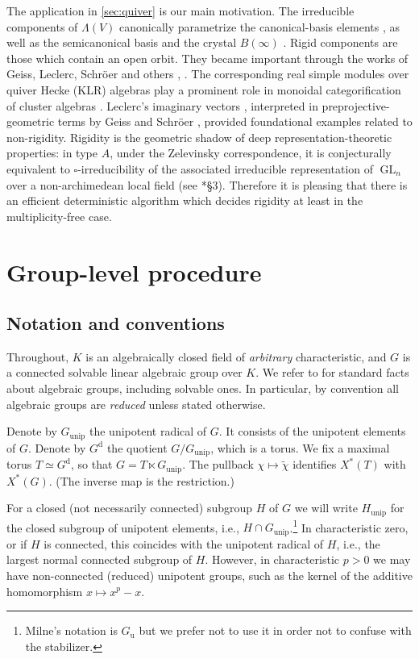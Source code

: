 \documentclass[12pt]{article}
\newcommand{\GL}{\operatorname{GL}}
\newcommand{\rad}[1]{#1_{\operatorname{unip}}}
\newcommand{\diag}{\mathrm{d}}
\begin{document}
The application in \cref{sec:quiver} is our main motivation. 
The irreducible components of $\Lambda(V)$ canonically parametrize the canonical-basis elements \cite{MR1088333}, as well as 
the semicanonical basis \cite{MR1758244} and the crystal $B(\infty)$ \cite{MR1458969}.
Rigid components are those which contain an open orbit. They became important through the works of Geiss, Leclerc, Schr\"oer and others \cite{MR2115084}, \cite{MR2144987}.
The corresponding real simple modules over quiver Hecke (KLR) algebras play a prominent role in monoidal categorification of cluster algebras \cite{MR3758148}.
Leclerc's imaginary vectors \cite{MR1959765}, interpreted in preprojective-geometric terms by Geiss and Schr\"oer \cite{MR2115084}, provided foundational examples related to non-rigidity.
Rigidity is the geometric shadow of deep representation-theoretic properties: in type $A$, 
under the Zelevinsky correspondence, it is conjecturally equivalent to $\square$-irreducibility of the associated irreducible representation of $\GL_n$ over a non-archimedean local field
(see \cite{MR4847251}*{\S3}).
Therefore it is pleasing that there is an efficient deterministic algorithm which decides rigidity at least in the multiplicity-free case.



\section{Group-level procedure}\label{sec:setup}

\subsection{Notation and conventions}
Throughout, $K$ is an algebraically closed field of
\emph{arbitrary} characteristic, and $G$ is a connected solvable linear algebraic group over $K$.
We refer to \cite{MR1102012} for standard facts about algebraic groups, including solvable ones.
In particular, by convention all algebraic groups are \emph{reduced} unless stated otherwise.

Denote by $\rad{G}$ the unipotent radical of $G$. It consists of the unipotent elements of $G$.
Denote by $G^{\diag}$ the quotient $G/\rad{G}$, which is a torus.
We fix a maximal torus $T\simeq G^{\diag}$, so that $G=T\ltimes \rad{G}$.
The pullback $\chi\mapsto\tilde\chi$ identifies $X^*(T)$ with $X^*(G)$.
(The inverse map is the restriction.)

For a closed (not necessarily connected) subgroup $H$ of $G$ we will write $\rad{H}$ for the closed subgroup
of unipotent elements, i.e., $H\cap \rad{G}$.\footnote{Milne's notation is $G_{\operatorname{u}}$ but we prefer not to use
it in order not to confuse with the stabilizer.}
In characteristic zero, or if $H$ is connected, this coincides with the unipotent radical
of $H$, i.e., the largest normal connected subgroup of $H$. However, in characteristic $p>0$ we may have
non-connected (reduced) unipotent groups, such as the kernel of the additive homomorphism $x\mapsto x^p-x$.
\end{document}
